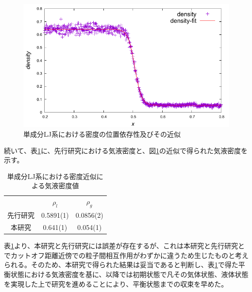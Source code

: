 \documentclass[titlepage]{jsreport}
\begin{document}
\begin{figure}[htbp]
    \begin{center}
        \includegraphics[width=14cm]{fig/ln78732-rn10976-ld0.629856-rd0.087808/ln78732-rn10976-ld0.629856-rd0.087808-fitting.pdf}
    \end{center}
    \caption{単成分LJ系における密度の位置依存性及びその近似}
    \label{fig:ln78732-rn10976-ld0.629856-rd0.087808-fitting}
\end{figure}

続いて、表\ref{table:ln78732-rn10976-ld0.629856-rd0.087808-fitting}に、先行研究\cite{gas-liquid-equilibrium}における気液密度と、図\ref{fig:ln78732-rn10976-ld0.629856-rd0.087808-fitting}の近似で得られた気液密度を示す。

\begin{table}[htbp]
    \begin{center}
        \caption{単成分LJ系における密度近似による気液密度値}
        \label{table:ln78732-rn10976-ld0.629856-rd0.087808-fitting}
            \begin{tabular}{c || c | c}
                & $\rho_l$ & $\rho_g$ \\
                先行研究 & 0.5891(1) & 0.0856(2) \\
                本研究 & 0.641(1) & 0.054(1)
            \end{tabular}
    \end{center}
\end{table}

表\ref{table:ln78732-rn10976-ld0.629856-rd0.087808-fitting}より、本研究と先行研究には誤差が存在するが、これは本研究と先行研究とでカットオフ距離近傍での粒子間相互作用がわずかに違うため生じたものと考えられる。そのため、本研究で得られた結果は妥当であると判断し、表\ref{table:ln78732-rn10976-ld0.629856-rd0.087808-fitting}で得た平衡状態における気液密度を基に、以降では初期状態で凡その気体状態、液体状態を実現した上で研究を進めることにより、平衡状態までの収束を早めた。
\end{document}
